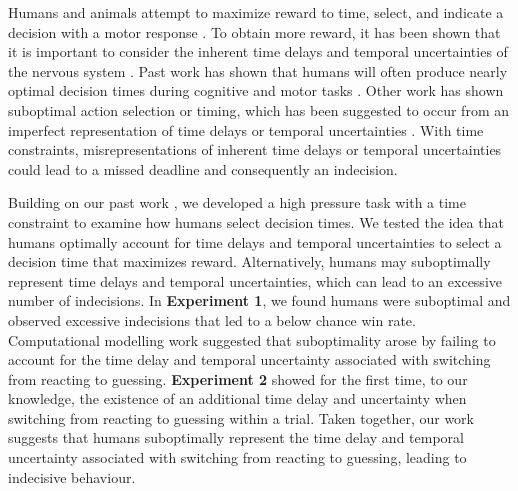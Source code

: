 \documentclass[man,donotrepeattitle,floatsintext,letterpaper,12pt]{apa7}
\newcommand\boldblue[1]{\textcolor{mydarkblue}{\textbf{#1}}}
\begin{document}
Humans and animals attempt to maximize reward to time, select, and indicate a decision with a motor response \autocite{drugowitschOptimalDecisionmakingTimevarying2014, balciOptimalTemporalRisk2011, bogaczPhysicsOptimalDecision2006,hudsonOptimalCompensationTemporal2008, trommershauserHumansRapidlyEstimate2006}. To obtain more reward, it has been shown that it is important to consider the inherent time delays and temporal uncertainties of the nervous system \autocite{drugowitschTuningSpeedaccuracyTradeoff2015,balciOptimalTemporalRisk2011,hudsonOptimalCompensationTemporal2008,acerbiInternalRepresentationsTemporal2012,faisalNoiseNervousSystem2008,kordingBayesianDecisionTheory2006,wolpertMotorControlDecisionmaking2012,tanisAccuracyEffortCosts2023,lokeshVisualAccuracyDominates2023}. Past work has shown that humans will often produce nearly optimal decision times during cognitive \autocite{balciOptimalTemporalRisk2011,mileticCautionDecisionmakingTime2019} and motor tasks \autocite{hudsonOptimalCompensationTemporal2008,faisalOptimalCombinationSensory2009}. Other work has shown suboptimal action selection or timing, which has been suggested to occur from an imperfect representation of time delays or temporal uncertainties \autocite{otaMotorPlanningTemporal2015, drugowitschComputationalPrecisionMental2016, onagawaSensorimotorStrategySelection2021, onagawaRiskAversionAdjustment2019}. With time constraints, misrepresentations of inherent time delays or temporal uncertainties could lead to a missed deadline and consequently an indecision. 

Building on our past work \autocite{lokeshHumansUtilizeSensory2022}, we developed a high pressure task with a time constraint to examine how humans select decision times. We tested the idea that humans optimally account for time delays and temporal uncertainties to select a decision time that maximizes reward. Alternatively, humans may suboptimally represent time delays and temporal uncertainties, which can lead to an excessive number of indecisions. In \boldblue{Experiment 1}, we found humans were suboptimal and observed excessive indecisions that led to a below chance win rate. Computational modelling work suggested that suboptimality arose by failing to account for the time delay and temporal uncertainty associated with switching from reacting to guessing. \boldblue{Experiment 2} showed for the first time, to our knowledge, the existence of an additional time delay and uncertainty when switching from reacting to guessing within a trial. Taken together, our work suggests that humans suboptimally represent the time delay and temporal uncertainty associated with switching from reacting to guessing, leading to indecisive behaviour. 
\end{document}
